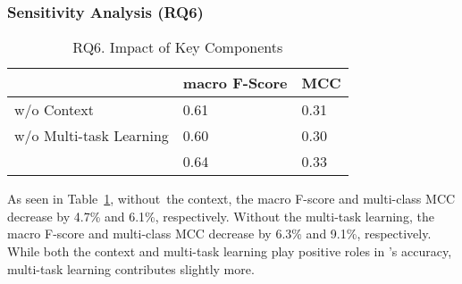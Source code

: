 \subsubsection{\bf Sensitivity Analysis (RQ6)}

\begin{table}[t]
	\caption{RQ6. Impact of Key Components}
	\vspace{-0.1in}
	\begin{center}
\small
		\tabcolsep 4pt
		\renewcommand{\arraystretch}{1} \begin{tabular}{p{3.5cm}<{\centering}|p{2cm}<{\centering}p{1.2cm}<{\centering}}
			
			\hline
			                         & macro  F-Score & MCC \\ 
			\hline
			
			\tool w/o Context        &  0.61    & 0.31         \\
			\tool w/o Multi-task Learning  &  0.60    & 0.30         \\
			\tool                    &  0.64    & 0.33         \\
			\hline
		\end{tabular}
		\label{RQ4-result-1}
	\end{center}
\end{table}

As seen in Table~\ref{RQ4-result-1}, without~the context, the macro
F-score and multi-class MCC decrease by 4.7\% and 6.1\%,
respectively.
Without the multi-task learning, the macro F-score and multi-class
MCC decrease by 6.3\% and 9.1\%, respectively. While both the
context and multi-task learning play positive roles in 
{\tool}'s accuracy, multi-task learning contributes slightly
more.


